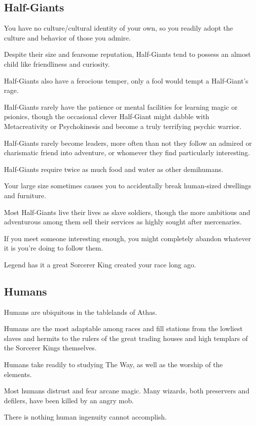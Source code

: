 \begin{multicols}{2}
\subsection{Half-Giants}

\begin{description}
    \item You have no culture/cultural identity of your own, so you readily adopt the culture and behavior of those you admire.
    \item Despite their size and fearsome reputation, Half-Giants tend to possess an almost child like friendliness and curiosity.
    \item Half-Giants also have a ferocious temper, only a fool would tempt a Half-Giant’s rage.
    \item Half-Giants rarely have the patience or mental facilities for learning magic or psionics, though the occasional clever Half-Giant might dabble with Metacreativity or Psychokinesis and become a truly terrifying psychic warrior.
    \item Half-Giants rarely become leaders, more often than not they follow an admired or charismatic friend into adventure, or whomever they find particularly interesting.
    \item Half-Giants require twice as much food and water as other demihumans.
    \item Your large size sometimes causes you to accidentally break human-sized dwellings and furniture.
    \item Most Half-Giants live their lives as slave soldiers, though the more ambitious and adventurous among them sell their services as highly sought after mercenaries.
    \item If you meet someone interesting enough, you might completely abandon whatever it is you’re doing to follow them.
    \item Legend has it a great Sorcerer King created your race long ago.
\end{description}

\subsection{Humans}

\begin{description}
    \item Humans are ubiquitous in the tablelands of Athas.
    \item Humans are the most adaptable among races and fill stations from the lowliest slaves and hermits to the rulers of the great trading houses and high templars of the Sorcerer Kings themselves.
    \item Humans take readily to studying The Way, as well as the worship of the elements.
    \item Most humans distrust and fear arcane magic. Many wizards, both preservers and defilers, have been killed by an angry mob.
    \item There is nothing human ingenuity cannot accomplish.
\end{description}


\end{multicols}
